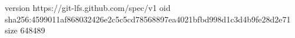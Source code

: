 version https://git-lfs.github.com/spec/v1
oid sha256:4599011af868032426e2c5c5cd78568897ea4021bfbd998d1c3d4b9fe28d2e71
size 648489
